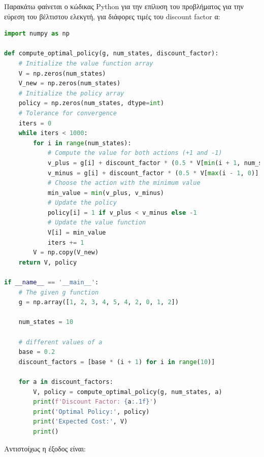 \documentclass{article}
\newcommand{\eng}[1]{\foreignlanguage{english}{#1}} %
\begin{document}
Παρακάτω φαίνεται ο κώδικας \eng{Python} για την επίλυση του προβλήματος
για την εύρεση του βέλτιστου ελεκγτή, για διάφορες τιμές του \eng{discount 
factor} α:

\begin{lstlisting}[language=Python]
import numpy as np

def compute_optimal_policy(g, num_states, discount_factor):
    # Initialize the value function array
    V = np.zeros(num_states)
    V_new = np.zeros(num_states)
    # Initialize the policy array
    policy = np.zeros(num_states, dtype=int)
    # Tolerance for convergence
    iters = 0
    while iters < 1000:
        for i in range(num_states):
            # Compute the value for both actions (+1 and -1)
            v_plus = g[i] + discount_factor * (0.5 * V[min(i + 1, num_states - 1)] + 0.5 * V[i])
            v_minus = g[i] + discount_factor * (0.5 * V[max(i - 1, 0)] + 0.5 * V[i])
            # Choose the action with the minimum value
            min_value = min(v_plus, v_minus)
            # Update the policy
            policy[i] = 1 if v_plus < v_minus else -1
            # Update the value function
            V[i] = min_value
            iters += 1
        V = np.copy(V_new)
    return V, policy

if __name__ == '__main__':
    # The given g function
    g = np.array([1, 2, 3, 4, 5, 4, 2, 0, 1, 2])

    num_states = 10

    # different values of a
    base = 0.2
    discount_factors = [base * (i + 1) for i in range(10)]

    for a in discount_factors:
        V, policy = compute_optimal_policy(g, num_states, a)
        print(f'Discount Factor: {a:.1f}')
        print('Optimal Policy:', policy)
        print('Expected Cost:', V)
        print()
\end{lstlisting}

Αντιστοίχως η έξοδος είναι:
\end{document}
